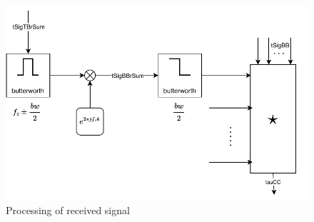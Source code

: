 \begin{figure}[h]
	\includegraphics[width=\linewidth]{images/recsig}
	
	\caption{Processing of received signal}
	\label{fig:recsig}
\end{figure}


